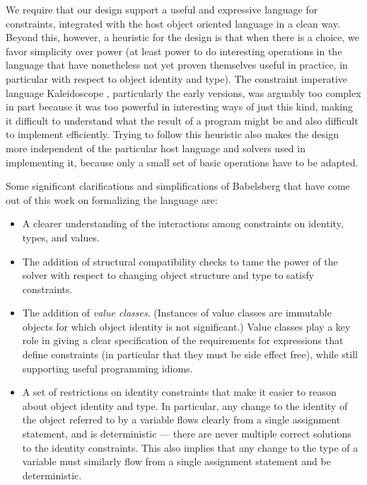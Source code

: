 \documentclass{article}
\begin{document}
We require that our design support a useful and expressive language
for constraints, integrated with the host object oriented language in
a clean way.  Beyond this, however, a heuristic for the design is that
when there is a choice, we favor simplicity over power (at least power
to do interesting operations in the language that have nonetheless not
yet proven themselves useful in practice, in particular with respect
to object identity and type).  The constraint imperative language
Kaleidoscope \cite{freeman-benson-oopsla-1990, freeman-benson-phd,
  freeman-benson-iccl-1992, freeman-benson-ecoop-1992}, particularly
the early versions, was arguably too complex in part because it was
too powerful in interesting ways of just this kind, making it
difficult to understand what the result of a program might be and also
difficult to implement efficiently.  Trying to follow this heuristic
also makes the design more independent of the particular host language
and solvers used in implementing it, because only a small set of basic
operations have to be adapted.

Some significant clarifications and simplifications of Babelsberg that
have come out of this work on formalizing the language are:

\begin{itemize}
\item A clearer understanding of the interactions among constraints
  on identity, types, and values.
\item The addition of structural compatibility checks to tame the
  power of the solver with respect to changing object structure and
  type to satisfy constraints.
\item The addition of \emph{value classes}.  (Instances of value
  classes are immutable objects for which object identity is not
  significant.)  Value classes play a key role in giving a clear specification
  of the requirements for expressions that define constraints (in
  particular that they must be side effect free), while still supporting
  useful programming idioms.
\item A set of restrictions on identity constraints that make it
  easier to reason about object identity and type.  In particular, any
  change to the identity of the object referred to by a variable flows
  clearly from a single assignment statement, and is deterministic ---
  there are never multiple correct solutions to the identity
  constraints.  This also implies that any change to the type of a
  variable must similarly flow from a single assignment statement and
  be deterministic.
\end{itemize}
\end{document}
